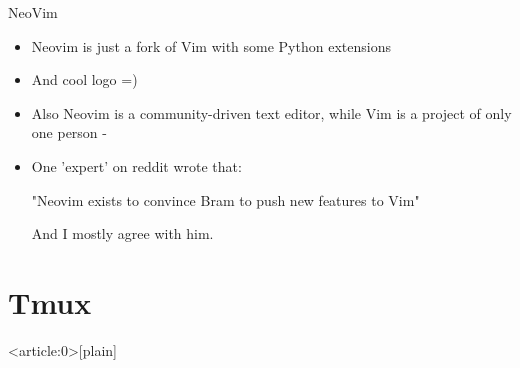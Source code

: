\documentclass[usenames,dvipsnames,10pt,aspectratio=169]{beamer}
\begin{document}
\begin{frame}{NeoVim}
    \begin{itemize}
        \item Neovim is just a fork of Vim with some Python extensions 
        \item And cool logo =)
        \item Also Neovim is a community-driven text editor, while Vim is a project of only one person - 
        \item One 'expert' on reddit wrote that:
        
                \hspace*{1cm} "Neovim exists to convince Bram to push new features to Vim"
            
            And I mostly agree with him.
    \end{itemize}    
\end{frame}


\section{Tmux}
{ %
    \begin{frame}<article:0>[plain]
     \end{frame}
}
\end{document}
